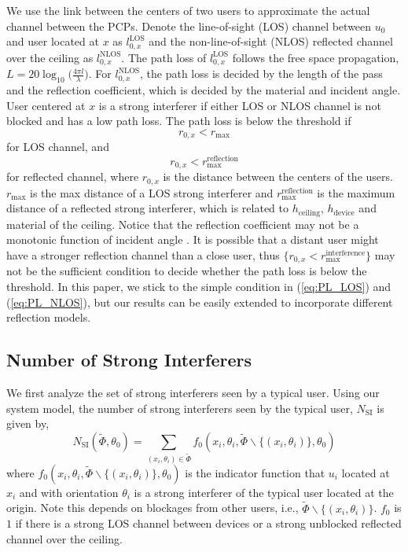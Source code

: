 \documentclass[10pt, conference, letterpaper]{IEEEtran}
\begin{document}
We use the link between the centers of two users to approximate the actual channel between the PCPs. Denote the line-of-sight (LOS) channel between $u_0$ and user located at $x$ as $l_{0,x}^{\mathrm{LOS}}$ and the non-line-of-sight (NLOS) reflected channel over the ceiling as $l_{0,x}^{\mathrm{NLOS}}$. The path loss of $l_{0,x}^{\mathrm{LOS}}$ follows the free space propagation, $L = 20\log_{10}\big(\frac{4\pi l}{\lambda}\big)$. For $l_{0,x}^{\mathrm{NLOS}}$, the path loss is decided by the length of the pass and the reflection coefficient, which is decided by the material and incident angle. User centered at $x$ is a strong interferer if either LOS or NLOS channel is not blocked and has a low path loss. The path loss is below the threshold if  
\begin{equation}\label{eq:PL_LOS}
r_{0,x} < r_{\max}
\end{equation}
for LOS channel, and 
\begin{equation}\label{eq:PL_NLOS}
r_{0,x} < r_{\max}^{\mathrm{reflection}}
\end{equation}
for reflected channel, where $r_{0,x}$ is the distance between the centers of the users. $r_{\max}$ is the max distance of a LOS strong interferer and $r_{\max}^{\mathrm{reflection}}$ is the maximum distance of a reflected strong interferer, which is related to $h_{\mathrm{ceiling}}$, $h_{\mathrm{device}}$ and material of the ceiling. Notice that the reflection coefficient may not be a monotonic function of incident angle \cite{reflection}. It is possible that a distant user might have a stronger reflection channel than a close user, thus $\{r_{0,x}<r_{\max}^{\mathrm{interference}}\}$ may not be the sufficient condition to decide whether the path loss is below the threshold. In this paper, we stick to the simple condition in (\ref{eq:PL_LOS}) and (\ref{eq:PL_NLOS}), but our results can be easily extended to incorporate different reflection models.





\subsection{Number of Strong Interferers}
We first analyze the set of strong interferers seen by a typical user. Using our system model, the number of strong interferers seen by the typical user, $N_{\mathrm{SI}}$ is given by, 
\begin{equation}
N_{\mathrm{SI}}(\tilde{\Phi}, \theta_0) = \sum_{(x_i, \theta_i)\in \tilde{\Phi}}f_0(x_i, \theta_i, \tilde{\Phi}\backslash\{(x_i,\theta_i)\}, \theta_0)
\end{equation}
where $f_0(x_i, \theta_i, \tilde{\Phi}\backslash\{(x_i,\theta_i)\}, \theta_0)$ is the indicator function that $u_i$ located at $x_i$ and with orientation $\theta_i$ is a strong interferer of the typical user located at the origin. Note this depends on blockages from other users, i.e., $\tilde{\Phi}\backslash\{(x_i,\theta_i)\}$. $f_0$ is $1$ if there is a strong LOS channel between devices or a strong unblocked reflected channel over the ceiling.
\end{document}
